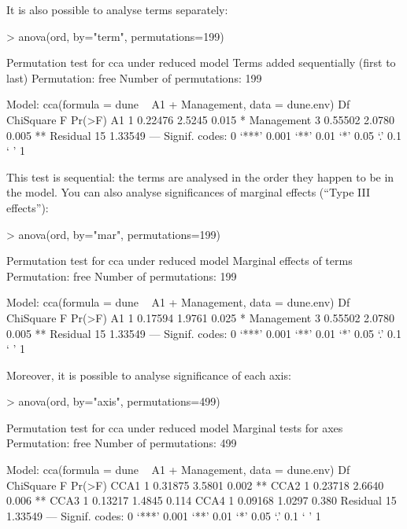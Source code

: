 \documentclass[a4paper,10pt]{article}
\begin{document}
It is also possible to analyse terms separately:
\begin{Schunk}
\begin{Sinput}
> anova(ord, by="term", permutations=199)
\end{Sinput}
\begin{Soutput}
Permutation test for cca under reduced model
Terms added sequentially (first to last)
Permutation: free
Number of permutations: 199

Model: cca(formula = dune ~ A1 + Management, data = dune.env)
           Df ChiSquare      F Pr(>F)   
A1          1   0.22476 2.5245  0.015 * 
Management  3   0.55502 2.0780  0.005 **
Residual   15   1.33549                 
---
Signif. codes:  0 ‘***’ 0.001 ‘**’ 0.01 ‘*’ 0.05 ‘.’ 0.1 ‘ ’ 1
\end{Soutput}
\end{Schunk}
This test is sequential: the terms are analysed
in the order they happen to be in the model. You can also analyse
significances of marginal effects (``Type III effects''):
\begin{Schunk}
\begin{Sinput}
> anova(ord, by="mar", permutations=199)
\end{Sinput}
\begin{Soutput}
Permutation test for cca under reduced model
Marginal effects of terms
Permutation: free
Number of permutations: 199

Model: cca(formula = dune ~ A1 + Management, data = dune.env)
           Df ChiSquare      F Pr(>F)   
A1          1   0.17594 1.9761  0.025 * 
Management  3   0.55502 2.0780  0.005 **
Residual   15   1.33549                 
---
Signif. codes:  0 ‘***’ 0.001 ‘**’ 0.01 ‘*’ 0.05 ‘.’ 0.1 ‘ ’ 1
\end{Soutput}
\end{Schunk}

Moreover, it is possible to analyse significance of each axis:
\begin{Schunk}
\begin{Sinput}
> anova(ord, by="axis", permutations=499)
\end{Sinput}
\begin{Soutput}
Permutation test for cca under reduced model
Marginal tests for axes
Permutation: free
Number of permutations: 499

Model: cca(formula = dune ~ A1 + Management, data = dune.env)
         Df ChiSquare      F Pr(>F)   
CCA1      1   0.31875 3.5801  0.002 **
CCA2      1   0.23718 2.6640  0.006 **
CCA3      1   0.13217 1.4845  0.114   
CCA4      1   0.09168 1.0297  0.380   
Residual 15   1.33549                 
---
Signif. codes:  0 ‘***’ 0.001 ‘**’ 0.01 ‘*’ 0.05 ‘.’ 0.1 ‘ ’ 1
\end{Soutput}
\end{Schunk}
\end{document}
